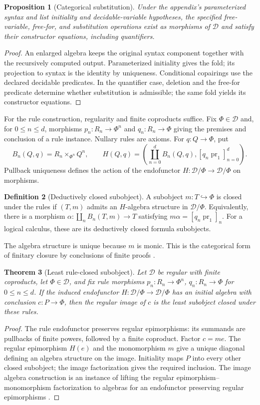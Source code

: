 \documentclass[11pt]{article}
\newtheorem{theorem}{Theorem}[section]
\newtheorem{proposition}[theorem]{Proposition}
\theoremstyle{definition}\newtheorem{definition}[theorem]{Definition}
\newcommand{\D}{\mathcal D}
\begin{document}
\begin{proposition}[Categorical substitution]
Under the appendix's parameterized syntax and list initiality and
decidable-variable hypotheses, the specified free-variable,
free-for, and substitution operations exist as morphisms of $\D$
and satisfy their constructor equations, including quantifiers.
\end{proposition}
\begin{proof}
An enlarged algebra keeps the original syntax component together
with the recursively computed output.
Parameterized initiality gives the fold; its projection to syntax
is the identity by uniqueness. Conditional copairings use the
declared decidable predicates. In the quantifier case, deletion
and the free-for predicate determine whether substitution is
admissible; the same fold yields its constructor equations.
\end{proof}

For the rule construction, regularity and finite coproducts suffice.
Fix $\Phi\in\D$ and, for $0\le n\le d$, morphisms
$p_n:R_n\to\Phi^n$ and $q_n:R_n\to\Phi$ giving the premises
and conclusion of a rule instance. Nullary rules are axioms.
For $q:Q\to\Phi$, put
\[
 B_n(Q,q)=R_n\times_{\Phi^n}Q^n,\qquad
 H(Q,q)=\left(\coprod_{n=0}^d B_n(Q,q),
                   [q_n\operatorname{pr}_1]_{n=0}^d\right).
\]
Pullback uniqueness defines the action of the endofunctor
$H:\D/\Phi\to\D/\Phi$ on morphisms.

\begin{definition}[Deductively closed subobject]
A subobject $m:T\hookrightarrow\Phi$ is closed under the rules
if $(T,m)$ admits an $H$-algebra structure in $\D/\Phi$.
Equivalently, there is a morphism
$\alpha:\coprod_n B_n(T,m)\to T$ satisfying
$m\alpha=[q_n\operatorname{pr}_1]_n$.
For a logical calculus, these are its deductively closed formula
subobjects.
\end{definition}
The algebra structure is unique because $m$ is monic. This is
the categorical form of finitary closure by conclusions of finite
proofs \cite{Aczel}.

\begin{theorem}[Least rule-closed subobject]
Let $\D$ be regular with finite coproducts, let $\Phi\in\D$,
and fix rule morphisms $p_n:R_n\to\Phi^n$, $q_n:R_n\to\Phi$
for $0\le n\le d$.
If the induced endofunctor $H:\D/\Phi\to\D/\Phi$ has an
initial algebra with conclusion $c:P\to\Phi$, then the regular
image of $c$ is the least subobject closed under these rules.
\end{theorem}
\begin{proof}
The rule endofunctor preserves regular epimorphisms: its summands
are pullbacks of finite powers, followed by a finite coproduct.
Factor $c=me$. The regular epimorphism $H(e)$ and the monomorphism
$m$ give a unique diagonal defining an algebra structure on the
image. Initiality maps $P$ into every other closed subobject;
the image factorization gives the required inclusion. The image
algebra construction is an instance of lifting the regular
epimorphism--monomorphism factorization to algebras for an
endofunctor preserving regular epimorphisms \cite{Wissmann}.
\end{proof}
\end{document}
